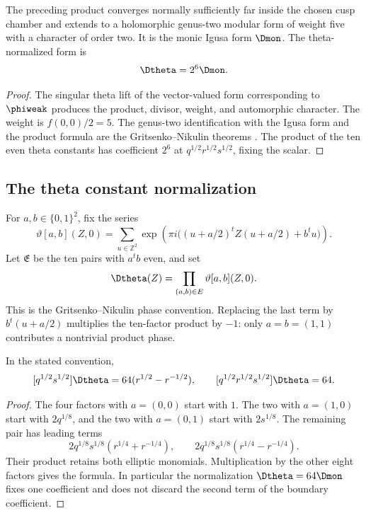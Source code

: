 \begin{theorem}
The preceding product converges normally sufficiently far inside the chosen cusp chamber and extends to a holomorphic genus-two modular form of weight five with a character of order two. It is the monic Igusa form $\Dmon$. The theta-normalized form is
\[
 \Dtheta=2^6\Dmon.
\]
\end{theorem}
\begin{proof}
The singular theta lift of the vector-valued form corresponding to $\phiweak$ produces the product, divisor, weight, and automorphic character. The weight is $f(0,0)/2=5$. The genus-two identification with the Igusa form and the product formula are the Gritsenko--Nikulin theorems \cite{Borcherds95,Borcherds98,GN97,GN98b}. The product of the ten even theta constants has coefficient $2^6$ at $q^{1/2}r^{1/2}s^{1/2}$, fixing the scalar.
\end{proof}

\subsection{The theta constant normalization}
For \(a,b\in\{0,1\}^2\), fix the series
\[
 \vartheta[a,b](Z,0)=\sum_{u\in\mathbb Z^2}
 \exp\!\left(\pi i\bigl((u+a/2)^tZ(u+a/2)+b^tu\bigr)\right).
\]
Let \(\mathfrak E\) be the ten pairs with \(a^tb\) even, and set
\[
 \Dtheta(Z)=\prod_{(a,b)\in\mathfrak E}\vartheta[a,b](Z,0).
\]
This is the Gritsenko--Nikulin phase convention. Replacing the last
term by \(b^t(u+a/2)\) multiplies the ten-factor product by \(-1\):
only \(a=b=(1,1)\) contributes a nontrivial product phase.

\begin{proposition}
In the stated convention,
\[
 [q^{1/2}s^{1/2}]\Dtheta=64(r^{1/2}-r^{-1/2}),
 \qquad [q^{1/2}r^{1/2}s^{1/2}]\Dtheta=64.
\]
\end{proposition}
\begin{proof}
The four factors with \(a=(0,0)\) start with \(1\). The two
with \(a=(1,0)\) start with \(2q^{1/8}\), and the two with
\(a=(0,1)\) start with \(2s^{1/8}\). The remaining pair has
leading terms
\[
 2q^{1/8}s^{1/8}(r^{1/4}+r^{-1/4}),\qquad
 2q^{1/8}s^{1/8}(r^{1/4}-r^{-1/4}).
\]
Their product retains both elliptic monomials. Multiplication by
the other eight factors gives the formula. In particular the
normalization \(\Dtheta=64\Dmon\) fixes one coefficient and
does not discard the second term of the boundary coefficient.
\end{proof}


